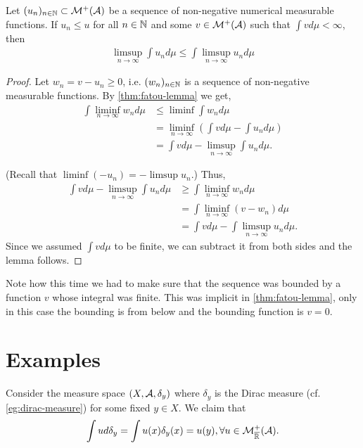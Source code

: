 \begin{cor}
	\label{cor:reverse-fatou}
	
	Let $(u_n)_{n\in\mathbb{N}} \subset \mathcal{M}^+(\mathcal{A})$ be a sequence of non-negative numerical measurable functions. If $u_n \leq u$ for all $n \in \mathbb{N}$ and some $v \in \mathcal{M}^+(\mathcal{A})$ such that $\int v d\mu < \infty$, then
	\begin{align}
		\limsup_{n\to\infty} \int u_n d\mu \leq \int \limsup_{n\to \infty} u_n d\mu
	\end{align}
\end{cor}

\begin{proof}
	Let $w_n = v - u_n \geq 0$, i.e. $(w_n)_{n\in\mathbb{N}}$ is a sequence of non-negative measurable functions. By \autoref{thm:fatou-lemma} we get,
	\begin{align*}
		\int \liminf_{n\to \infty} w_n d\mu
		&\leq \liminf \int w_n d\mu \\
		&= \liminf_{n\to \infty} \left( \int v d\mu - \int u_n d\mu \right)\\
		&= \int vd\mu - \limsup_{n\to\infty} \int u_n d\mu.
	\end{align*}
	
	(Recall that $\liminf (-u_n) = -\limsup u_n$.) Thus,
	\begin{align*}
		\int v d\mu - \limsup_{n\to\infty} \int u_n d\mu
		&\geq \int \liminf_{n\to \infty} w_n d\mu \\
		&= \int \liminf_{n\to\infty} \left(v - w_n\right)d\mu \\
		&= \int vd\mu - \int \limsup_{n\to\infty} u_n d\mu.
	\end{align*}
	Since we assumed $\int v d\mu$ to be finite, we can subtract it from both sides and the lemma follows.
\end{proof}

Note how this time we had to make sure that the sequence was bounded by a function $v$ whose integral was finite. This was implicit in \autoref{thm:fatou-lemma}, only in this case the bounding is from below and the bounding function is $v = 0$.

\section{Examples}

\begin{eg}
	Consider the measure space $(X, \mathcal{A}, \delta_y)$ where $\delta_y$ is the Dirac measure (cf. \autoref{eg:dirac-measure}) for some fixed $y \in X$. We claim that
	\begin{align}
		\int u d\delta_y = \int u(x)\delta_y(x) = u(y), \forall u \in \mathcal{M}_{\overline{\mathbb{R}}}^+(\mathcal{A}).
	\end{align}
\end{eg}

